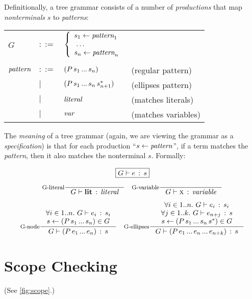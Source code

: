 \documentclass[
  10pt,
  paper=letter,
  footinclude=true,
  headinclude=true,
  american
]{scrbook}
\makeatletter
\newenvironment{Table}
  {\begin{center}\begin{tabular}{l l l @{\quad}l}}
  {\end{tabular}\end{center}}
\newcommand{\ddd}{\;\dots\;}
\newcommand{\dd}{\,...\,}
\newcommand{\Forall}[1]{\forall{#1}.\,\,}
\renewcommand{\<}{\le}
\makeatother
\begin{document}
Definitionally, a tree grammar consists of a number of
\emph{productions} that map \emph{nonterminals} $s$ to
\emph{patterns}:
\begin{Table}
  $G$
  &$::=$& $\left\{ \begin{array}{l}
    \production{s_1}{\emph{pattern}_1} \\
    \ddd \\
    \production{s_n}{\emph{pattern}_n}
    \end{array}\right.$ \\
  \\
  $\emph{pattern}$
  &$::=$& $\expr{P}{s_1 \dd s_n}$ &(regular pattern) \\
  &$|$&
  $\exprs{P}{s_1 \dd s_n}{s_{n+1}}$
  &(ellipses pattern) \\
  &$|$&   $\emph{literal}$ &(matches literals) \\
  &$|$&   $\emph{var}$ &(matches variables)
\end{Table}

The \emph{meaning} of a tree grammar (again, we are viewing the
grammar as a \emph{specification}) is that for each production
``$s \leftarrow \emph{pattern}$'', if a term matches the
\emph{pattern}, then it also matches the nonterminal $s$. Formally:

\[
\fbox{$G \vdash e\,:\,s$}
\]

\[
\inference
    [G-literal]
    {}
    {\saysG{G}{\lit{lit}}{\emph{literal}}}
\quad
\inference
    [G-variable]
    {}
    {\saysG{G}{\var{x}}{\emph{variable}}}
\]
    
\[
\inference
    [G-node]
    {\Forall{i \in 1..n} \saysG{G}{e_i}{s_i} \\
      \production{s}{\expr{P}{s_1 \dd s_n}} \in G}
    {\saysG{G}{\expr{P}{e_1 \dd e_n}}{s}}
\quad
\inference
    [G-ellipses]
    {\Forall{i \in 1..n} \saysG{G}{e_i}{s_i} \\
      \Forall{j \in 1..k} \saysG{G}{e_{n+j}}{s} \\
      \production{s}{\exprs{P}{s_1 \dd s_n}{s}} \in G}
    {\saysG{G}{\expr{P}{e_1 \dd e_n \dd e_{n+k}}}{s}}
\]


\section{Scope Checking}

(See \cref{fig:scope}.)
\end{document}
